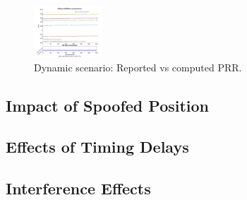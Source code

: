         \begin{figure}[h!]
          \centering
          \includegraphics[width=0.23\textwidth]{images/Tram_15_trip_Castello_to_Pescatore/filtered/Samsung_A51_Tram_15_trip_Castello_to_Pescatore_fig2.png}
          \caption{Dynamic scenario: Reported vs computed PRR.}
          \label{fig:dynamic_prr}
        \end{figure}


            
    \subsection{Impact of Spoofed Position}
        


    \subsection{Effects of Timing Delays}
    


    \subsection{Interference Effects}
    

